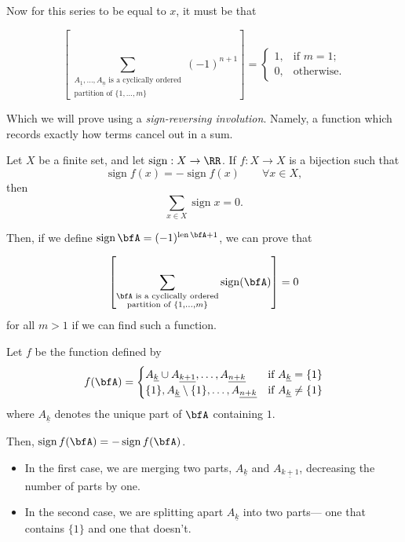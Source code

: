 \documentclass{article}
\DeclareMathOperator{\sign}{sign}
\DeclareMathOperator{\len}{len}
\begin{document}
Now for this series to be equal to $x$, it must be that

\[
    \left[
        \sum_{
            \substack{
                A_{\underline{1}},\ldots,A_{\underline{n}} \text{ is a cyclically ordered} \\
                \text{partition of }\{1,\ldots,m\}
            }
        }
        (-1)^{n+1}
    \right]
    =
    \begin{cases}
        1, & \text{if } m=1; \\
        0, & \text{otherwise}.
    \end{cases}
\]

Which we will prove using a \textit{sign-reversing involution}.
Namely, a function which records exactly how terms cancel out in a sum.

\begin{proposition}
    Let $X$ be a finite set, and let $\sign: X \to \RR$.
    If $f: X \to X$ is a bijection such that
    \[
        \sign f(x) = -\sign f(x) \qquad \forall x \in X,
    \]
    then
    \[
        \sum_{x \in X} \sign x = 0.
    \]
\end{proposition}

Then, if we define $\sign \bfA = (-1)^{\len \bfA + 1}$, we can prove that

\[
    \left[
        \sum_{
            \substack{
                \bfA \text{ is a cyclically ordered} \\
                \text{partition of }\{1,\ldots,m\}
            }
        }
        \sign(\bfA)
    \right]
    =
    0
\]
for all $m > 1$ if we can find such a function.

Let $f$ be the function defined by
\[
    f(\bfA)
    =
    \begin{cases}
        A_{\underline{k}} \cup A_{\underline{k+1}}, \ldots, A_{\underline{n+k}}
        & \text{if } A_{\underline{k}} = \{1\} \\
        \{1\}, A_{\underline{k}} \setminus \{1\}, \ldots, A_{\underline{n+k}}
        & \text{if } A_{\underline{k}} \neq \{1\} \\
    \end{cases}
\]
where $A_{\underline{k}}$ denotes the unique part of $\bfA$ containing $1$. 

Then, $\sign f(\bfA) = -\sign f(\bfA)$.
\begin{itemize}
    \item
        In the first case, we are merging two parts, $A_{\underline{k}}$ and $A_{\underline{k+1}}$, decreasing the number of parts by one.
    \item 
        In the second case, we are splitting apart $A_{\underline{k}}$ into two parts--- one that contains $\{1\}$ and one that doesn't.
\end{itemize}
\end{document}

